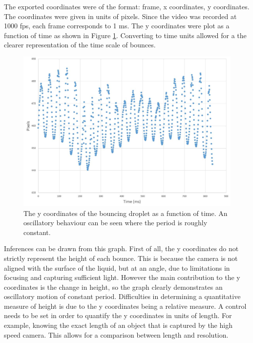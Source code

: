 The exported coordinates were of the format: frame, x coordinates, y coordinates. The coordinates were given in units of pixels. Since the video was recorded at 1000 fps, each frame corresponds to 1 ms. The y coordinates were plot as a function of time as shown in Figure \ref{fig:droplet_amplitude_graph}. Converting to time units allowed for a the clearer representation of the time scale of bounces.

\begin{figure}[htb]
\includegraphics[width=\textwidth]{prototype/exp_rep_imgs/droplet_amplitude_graph.jpg}
\centering
\caption{The y coordinates of the bouncing droplet as a function of time. An oscillatory behaviour can be seen where the period is roughly constant.}
\centering
\label{fig:droplet_amplitude_graph}
\end{figure}

Inferences can be drawn from this graph. First of all, the y coordinates do not strictly represent the height of each bounce. This is because the camera is not aligned with the surface of the liquid, but at an angle, due to limitations in focusing and capturing sufficient light. However the main contribution to the y coordinates is the change in height, so the graph clearly demonstrates an oscillatory motion of constant period. Difficulties in determining a quantitative measure of height is due to the y coordinates being a relative measure. A control needs to be set in order to quantify the y coordinates in units of length. For example, knowing the exact length of an object that is captured by the high speed camera. This allows for a comparison between length and resolution.

